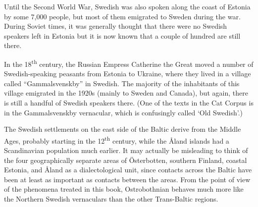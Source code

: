 Until the Second World War, Swedish was also spoken along the coast of Estonia by some 7,000 people, but most of them emigrated to Sweden during the war. During Soviet times, it was generally thought that there were no Swedish speakers left in Estonia but it is now known that a couple of hundred are still there.

In the 18\textsuperscript{th} century, the Russian Empress Catherine the Great moved a number of Swedish-speaking peasants from Estonia to Ukraine, where they lived in a village called “Gammalsvenskby” in Swedish. The majority of the inhabitants of this village emigrated in the 1920s (mainly to Sweden and Canada), but again, there is still a handful of Swedish speakers there. (One of the texts in the Cat Corpus is in the Gammalsvenskby vernacular, which is confusingly called  ‘Old Swedish’.)

The Swedish settlements on the east side of the Baltic derive from the Middle Ages, probably starting in the 12\textsuperscript{th} century, while the Åland islands had a Scandinavian population much earlier. It may actually be misleading to think of the four geographically separate areas of Österbotten, southern Finland, coastal Estonia, and Åland as a dialectological unit, since contacts across the Baltic have been at least as important as contacts between the areas. From the point of view of the phenomena treated in this book, Ostrobothnian behaves much more like the Northern Swedish vernaculars than the other Trans-Baltic regions.

